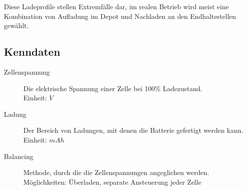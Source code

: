 Diese Ladeprofile stellen Extremfälle dar, im realen Betrieb wird meist eine Kombination von Aufladung im Depot und Nachladen an den Endhaltestellen gewählt.

\subsection{Kenndaten}

\begin{description}
	\item[Zellenspannung] Die elektrische Spannung einer Zelle bei 100\% Ladezustand.\\
	Einheit: $V$
	\item[Ladung] Der Bereich von Ladungen, mit denen die Batterie gefertigt werden kann.\\
	Einheit: $mAh$ 	
	\item[Balancing] Methode, durch die die Zellenspannungen angeglichen werden.\\
	Möglichkeiten: Überladen, separate Ansteuerung jeder Zelle
\end{description}

